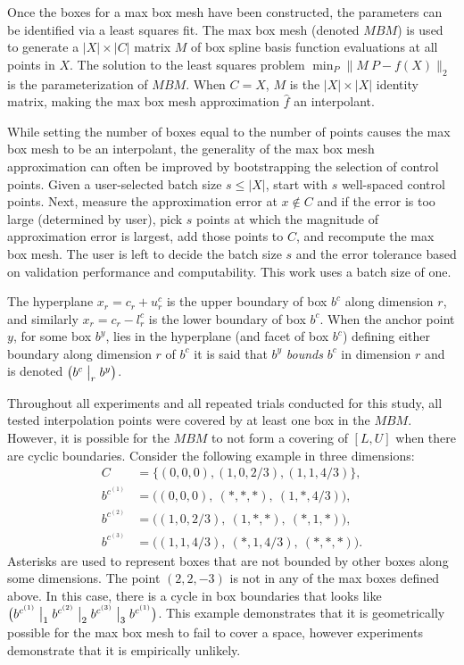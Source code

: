 Once the boxes for a max box mesh have been constructed, the parameters can be identified via a least squares fit. The max box mesh (denoted $MBM$) is used to generate a $|X| \times |C|$ matrix $M$ of box spline basis function evaluations at all points in $X$. The solution to the least squares problem $\min_P \bigl\| M \ P - f(X) \bigr\|_2$ is the parameterization of $MBM$. When $C = X$, $M$ is the $|X| \times |X|$ identity matrix, making the max box mesh approximation $\hat f$ an interpolant.

While setting the number of boxes equal to the number of points causes the max box mesh to be an interpolant, the generality of the max box mesh approximation can often be improved by bootstrapping the selection of control points. Given a user-selected batch size $s \leq |X|$, start with $s$ well-spaced control points. Next, measure the approximation error at $x \notin C$ and if the error is too large (determined by user), pick $s$ points at which the magnitude of approximation error is largest, add those points to $C$, and recompute the max box mesh. The user is left to decide the batch size $s$ and the error tolerance based on validation performance and computability. This work uses a batch size of one.

\begin{definition}
The hyperplane $x_r = c_r + u^c_r$ is the upper boundary of box $b^c$ along dimension $r$, and similarly $x_r = c_r - l^c_r$ is the lower boundary of box $b^c$. When the anchor point $y$, for some box $b^y$, lies in the hyperplane (and facet of box $b^c$) defining either boundary along dimension $r$ of $b^c$ it is said that $b^y$ \textit{bounds} $b^c$ in dimension $r$ and is denoted $\bigl( b^c \bigm\vert_r b^y \bigr)$.
\end{definition}

Throughout all experiments and all repeated trials conducted for this study, all tested interpolation points were covered by at least one box in the $MBM$. However, it is possible for the $MBM$ to not form a covering of $[L,U]$ when there are cyclic boundaries. Consider the following example in three dimensions:
\begin{align*}
  C         &= \bigl\{(0,0,0), (1,0,2/3), (1,1,4/3)\bigr\}, \\
  b^{c^{(1)}} &= \bigl( (0,0,0),  \ (*,*,*),  \ (1,*,4/3) \bigr), \\
  b^{c^{(2)}} &= \bigl( (1,0,2/3),\ (1,*,*),  \ (*,1,*)   \bigr), \\
  b^{c^{(3)}} &= \bigl( (1,1,4/3),\ (*,1,4/3),\ (*,*,*)   \bigr).
\end{align*}
Asterisks are used to represent boxes that are not bounded by other boxes along some dimensions. The point $(2,2,-3)$ is not in any of the max boxes defined above. In this case, there is a cycle in box boundaries that looks like $\bigl( b^{c^{(1)}} \bigm\vert_1 b^{c^{(2)}} \bigm\vert_2 b^{c^{(3)}} \bigm\vert_3 b^{c^{(1)}} \bigr)$. This example demonstrates that it is geometrically possible for the max box mesh to fail to cover a space, however experiments demonstrate that it is empirically unlikely.


